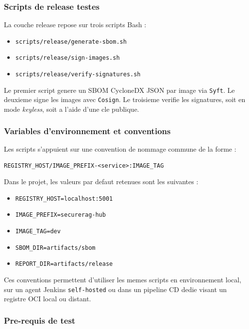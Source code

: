 \subsubsection{Scripts de release testes}

La couche release repose sur trois scripts Bash :

\begin{itemize}
  \item \texttt{scripts/release/generate-sbom.sh}
  \item \texttt{scripts/release/sign-images.sh}
  \item \texttt{scripts/release/verify-signatures.sh}
\end{itemize}

Le premier script genere un SBOM CycloneDX JSON par image via \texttt{Syft}. Le deuxieme signe les images avec \texttt{Cosign}. Le troisieme verifie les signatures, soit en mode \textit{keyless}, soit a l'aide d'une cle publique.

\subsubsection{Variables d'environnement et conventions}

Les scripts s'appuient sur une convention de nommage commune de la forme :

\begin{verbatim}
REGISTRY_HOST/IMAGE_PREFIX-<service>:IMAGE_TAG
\end{verbatim}

Dans le projet, les valeurs par defaut retenues sont les suivantes :

\begin{itemize}
  \item \texttt{REGISTRY\_HOST=localhost:5001}
  \item \texttt{IMAGE\_PREFIX=securerag-hub}
  \item \texttt{IMAGE\_TAG=dev}
  \item \texttt{SBOM\_DIR=artifacts/sbom}
  \item \texttt{REPORT\_DIR=artifacts/release}
\end{itemize}

Ces conventions permettent d'utiliser les memes scripts en environnement local, sur un agent Jenkins \texttt{self-hosted} ou dans un pipeline CD dedie visant un registre OCI local ou distant.

\subsubsection{Pre-requis de test}

